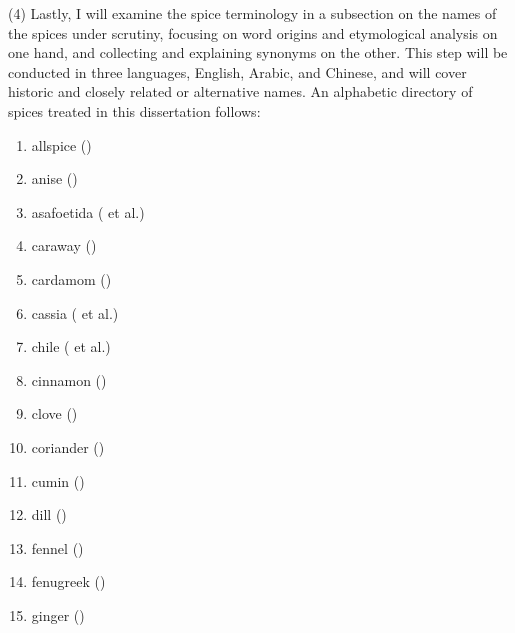 (4) Lastly, I will examine the spice terminology in a subsection on the names of the spices under scrutiny, focusing on word origins and etymological analysis on one hand, and collecting and explaining synonyms on the other. This step will be conducted in three languages, English, Arabic, and Chinese, and will cover historic and closely related or alternative names. An alphabetic directory of spices treated in this dissertation follows:


\clearpage

\begin{multicols}{2}
\begin{enumerate}
    \item allspice () \quad \hfill  \pageref{sec:allspice}
    \item anise () \quad \hfill \pageref{sec:anise}
    \item asafoetida ( et al.) \quad \hfill \pageref{sec:asafoetida}
    \item caraway () \quad \hfill \pageref{sec:caraway}
    \item cardamom () \quad \hfill \pageref{sec:cardamom}
    \item cassia ( et al.) \quad \hfill \pageref{sec:cassia}
    \item chile ( et al.) \quad \hfill \pageref{sec:chile}
    \item cinnamon () \quad \hfill \pageref{sec:cinnamon}
    \item clove () \quad \hfill \pageref{sec:clove}
    \item coriander () \quad \hfill \pageref{sec:coriander}
    \item cumin () \quad \hfill \pageref{sec:cumin}
    \item dill () \quad \hfill \pageref{sec:dill}
    \item fennel () \quad \hfill \pageref{sec:fennel}
    \item fenugreek () \quad \hfill \pageref{sec:fenugreek}
    \item ginger () \quad \hfill \pageref{sec:ginger}

\end{enumerate}
\end{multicols}
